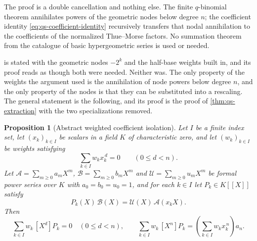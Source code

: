 \documentclass[11pt,oneside]{article}
\newtheorem{proposition}[theorem]{Proposition}
\theoremstyle{definition}
\theoremstyle{remark}
\begin{document}
The proof is a double cancellation and nothing else.  The finite $q$-binomial theorem
annihilates powers of the geometric nodes below degree $n$; the coefficient identity
\eqref{eq:qs-coefficient-identity} recursively transfers that nodal annihilation to the
coefficients of the normalized Thue--Morse factors.  No summation theorem from the catalogue
of basic hypergeometric series is used or needed.

 is stated with the geometric nodes $-2^k$ and the half-base weights
built in, and its proof reads as though both were needed.  Neither was.  The only property
of the weights the argument used is the annihilation of node powers below degree $n$, and
the only property of the nodes is that they can be substituted into a rescaling.  The
general statement is the following, and its proof is the proof of
\cref{thm:qs-extraction} with the two specializations removed.

\begin{proposition}[Abstract weighted coefficient isolation]
\label{prop:blu-isolation-general}
Let $I$ be a finite index set, let $(x_k)_{k\in I}$ be scalars in a field $K$ of
characteristic zero, and let $(w_k)_{k\in I}$ be weights satisfying
\begin{equation}
 \sum_{k\in I}w_kx_k^{\,d}=0\qquad(0\le d<n).             \label{eq:blu-abstract-annihilation}
\end{equation}
Let $\mathscr A=\sum_{m\ge0}a_mX^m$, $\mathscr B=\sum_{m\ge0}b_mX^m$ and
$\mathscr U=\sum_{m\ge0}u_mX^m$ be formal power series over $K$ with
$a_0=b_0=u_0=1$, and for each $k\in I$ let $P_k\in K[[X]]$ satisfy
\begin{equation}
 P_k(X)\,\mathscr B(X)=\mathscr U(X)\,\mathscr A(x_kX).    \label{eq:blu-abstract-bridge}
\end{equation}
Then
\begin{equation}
 \sum_{k\in I}w_k\,[X^d]P_k=0\quad(0\le d<n),
 \qquad
 \sum_{k\in I}w_k\,[X^n]P_k=\left(\sum_{k\in I}w_kx_k^{\,n}\right)a_n. \label{eq:blu-abstract-isolation}
\end{equation}
\end{proposition}
\end{document}
